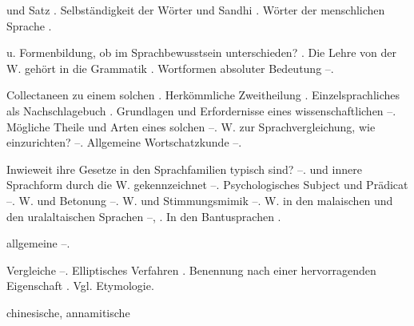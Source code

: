 \begin{register}
 und Satz \pageref{sp.88}. Selbständigkeit der Wörter und Sandhi \pageref{sp.210}.  Wörter der menschlichen Sprache \pageref{sp.255}.



 u. Formenbildung, ob im Sprachbewusstsein unterschieden? \pageref{sp.122}. Die Lehre von der W. gehört  in die Grammatik \pageref{sp.122}. Wortformen  absoluter Bedeutung \pageref{sp.443}–\pageref{sp.448}.

 Collectaneen zu einem solchen \pageref{sp.78}. Herkömmliche Zweitheilung \pageref{sp.85}. Einzelsprachliches als Nachschlagebuch \pageref{sp.121}. Grundlagen und Erfordernisse eines wissenschaftlichen \pageref{sp.121}–\pageref{sp.123}. Mögliche Theile und Arten eines solchen \pageref{sp.123}–\pageref{sp.125}. W. zur Sprachvergleichung, wie einzurichten? \pageref{sp.166}–\pageref{sp.167}. Allgemeine Wortschatzkunde \pageref{sp.482}–\pageref{sp.483}.


  Inwieweit ihre Gesetze in den Sprachfamilien typisch sind? \pageref{sp.149}–\pageref{sp.150}.  und innere Sprachform durch die W. gekennzeichnet \pageref{sp.359}–\pageref{sp.360}. Psychologisches Subject und Prädicat \pageref{sp.365}–\pageref{sp.373}. W. und Betonung \pageref{sp.373}–\pageref{sp.376}. W. und Stimmungsmimik \pageref{sp.380}–\pageref{sp.381}. W. in den malaischen und den uralaltaischen Sprachen \pageref{sp.415}–\pageref{sp.416}, \pageref{sp.418}. In den Bantusprachen \pageref{sp.420}.

  

 allgemeine \pageref{sp.482}–\pageref{sp.483}.

 Vergleiche \pageref{sp.40}–\pageref{sp.43}. Elliptisches Verfahren \pageref{sp.366}. Benennung nach einer hervorragenden Eigenschaft \pageref{sp.381}. Vgl. Etymologie.

 chinesische, annamitische 


\end{register}
